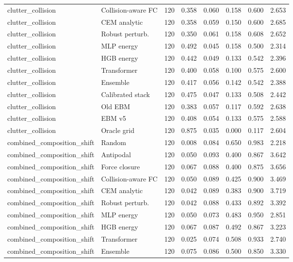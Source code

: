 {\begin{longtable}{llrrrrrr}
clutter\_collision & Collision-aware FC & 120 & 0.358 & 0.060 & 0.158 & 0.600 & 2.653 \\
clutter\_collision & CEM analytic & 120 & 0.358 & 0.059 & 0.150 & 0.600 & 2.685 \\
clutter\_collision & Robust perturb. & 120 & 0.350 & 0.061 & 0.158 & 0.608 & 2.652 \\
clutter\_collision & MLP energy & 120 & 0.492 & 0.045 & 0.158 & 0.500 & 2.314 \\
clutter\_collision & HGB energy & 120 & 0.442 & 0.049 & 0.133 & 0.542 & 2.396 \\
clutter\_collision & Transformer & 120 & 0.400 & 0.058 & 0.100 & 0.575 & 2.600 \\
clutter\_collision & Ensemble & 120 & 0.417 & 0.056 & 0.142 & 0.542 & 2.388 \\
clutter\_collision & Calibrated stack & 120 & 0.475 & 0.047 & 0.133 & 0.508 & 2.442 \\
clutter\_collision & Old EBM & 120 & 0.383 & 0.057 & 0.117 & 0.592 & 2.638 \\
clutter\_collision & EBM v5 & 120 & 0.408 & 0.054 & 0.133 & 0.575 & 2.588 \\
clutter\_collision & Oracle grid & 120 & 0.875 & 0.035 & 0.000 & 0.117 & 2.604 \\
combined\_composition\_shift & Random & 120 & 0.008 & 0.084 & 0.650 & 0.983 & 2.218 \\
combined\_composition\_shift & Antipodal & 120 & 0.050 & 0.093 & 0.400 & 0.867 & 3.642 \\
combined\_composition\_shift & Force closure & 120 & 0.067 & 0.088 & 0.400 & 0.875 & 3.656 \\
combined\_composition\_shift & Collision-aware FC & 120 & 0.050 & 0.089 & 0.425 & 0.900 & 3.469 \\
combined\_composition\_shift & CEM analytic & 120 & 0.042 & 0.089 & 0.383 & 0.900 & 3.719 \\
combined\_composition\_shift & Robust perturb. & 120 & 0.042 & 0.088 & 0.433 & 0.892 & 3.392 \\
combined\_composition\_shift & MLP energy & 120 & 0.050 & 0.073 & 0.483 & 0.950 & 2.851 \\
combined\_composition\_shift & HGB energy & 120 & 0.067 & 0.087 & 0.492 & 0.867 & 3.223 \\
combined\_composition\_shift & Transformer & 120 & 0.025 & 0.074 & 0.508 & 0.933 & 2.740 \\
combined\_composition\_shift & Ensemble & 120 & 0.075 & 0.086 & 0.500 & 0.850 & 3.330 \\

\end{longtable}}
